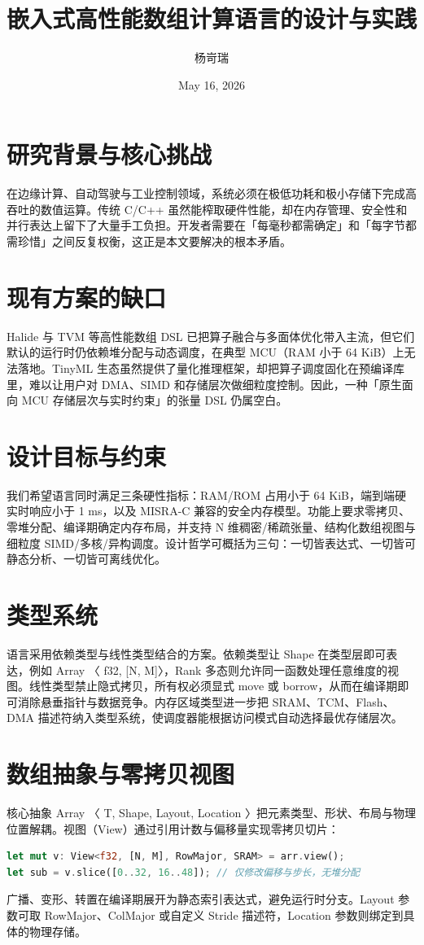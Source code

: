 \title{嵌入式高性能数组计算语言的设计与实践}
\author{杨岢瑞}
\date{May 16, 2026}
\maketitle
\chapter{研究背景与核心挑战}
在边缘计算、自动驾驶与工业控制领域，系统必须在极低功耗和极小存储下完成高吞吐的数值运算。传统 C/C++ 虽然能榨取硬件性能，却在内存管理、安全性和并行表达上留下了大量手工负担。开发者需要在「每毫秒都需确定」和「每字节都需珍惜」之间反复权衡，这正是本文要解决的根本矛盾。\par
\chapter{现有方案的缺口}
Halide 与 TVM 等高性能数组 DSL 已把算子融合与多面体优化带入主流，但它们默认的运行时仍依赖堆分配与动态调度，在典型 MCU（RAM 小于 64 KiB）上无法落地。TinyML 生态虽然提供了量化推理框架，却把算子调度固化在预编译库里，难以让用户对 DMA、SIMD 和存储层次做细粒度控制。因此，一种「原生面向 MCU 存储层次与实时约束」的张量 DSL 仍属空白。\par
\chapter{设计目标与约束}
我们希望语言同时满足三条硬性指标：RAM/ROM 占用小于 64 KiB，端到端硬实时响应小于 1 ms，以及 MISRA-C 兼容的安全内存模型。功能上要求零拷贝、零堆分配、编译期确定内存布局，并支持 N 维稠密/稀疏张量、结构化数组视图与细粒度 SIMD/多核/异构调度。设计哲学可概括为三句：一切皆表达式、一切皆可静态分析、一切皆可离线优化。\par
\chapter{类型系统}
语言采用依赖类型与线性类型结合的方案。依赖类型让 Shape 在类型层即可表达，例如 Array 〈 f32, [N, M]〉，Rank 多态则允许同一函数处理任意维度的视图。线性类型禁止隐式拷贝，所有权必须显式 move 或 borrow，从而在编译期即可消除悬垂指针与数据竞争。内存区域类型进一步把 SRAM、TCM、Flash、DMA 描述符纳入类型系统，使调度器能根据访问模式自动选择最优存储层次。\par
\chapter{数组抽象与零拷贝视图}
核心抽象 Array 〈 T, Shape, Layout, Location 〉把元素类型、形状、布局与物理位置解耦。视图（View）通过引用计数与偏移量实现零拷贝切片：\par
\begin{lstlisting}[language=rust]
let mut v: View<f32, [N, M], RowMajor, SRAM> = arr.view();
let sub = v.slice([0..32, 16..48]); // 仅修改偏移与步长，无堆分配
\end{lstlisting}
广播、变形、转置在编译期展开为静态索引表达式，避免运行时分支。Layout 参数可取 RowMajor、ColMajor 或自定义 Stride 描述符，Location 参数则绑定到具体的物理存储。\par
